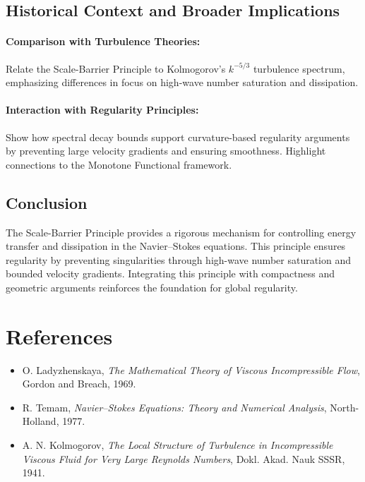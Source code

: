 \subsection{Historical Context and Broader Implications}

\paragraph{Comparison with Turbulence Theories:}
Relate the Scale-Barrier Principle to Kolmogorov's $k^{-5/3}$ turbulence spectrum, emphasizing differences in focus on high-wave number saturation and dissipation.

\paragraph{Interaction with Regularity Principles:}
Show how spectral decay bounds support curvature-based regularity arguments by preventing large velocity gradients and ensuring smoothness. Highlight connections to the Monotone Functional framework.

\subsection{Conclusion}
The Scale-Barrier Principle provides a rigorous mechanism for controlling energy transfer and dissipation in the Navier--Stokes equations. This principle ensures regularity by preventing singularities through high-wave number saturation and bounded velocity gradients. Integrating this principle with compactness and geometric arguments reinforces the foundation for global regularity.

\section*{References}
\begin{itemize}
    \item O. Ladyzhenskaya, \emph{The Mathematical Theory of Viscous Incompressible Flow}, Gordon and Breach, 1969.
    \item R. Temam, \emph{Navier--Stokes Equations: Theory and Numerical Analysis}, North-Holland, 1977.
    \item A. N. Kolmogorov, \emph{The Local Structure of Turbulence in Incompressible Viscous Fluid for Very Large Reynolds Numbers}, Dokl. Akad. Nauk SSSR, 1941.
\end{itemize}

